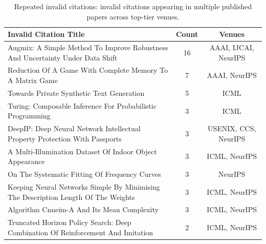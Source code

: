 \begin{table}[t]
\centering
\caption{Repeated invalid citations: invalid citations appearing in multiple published papers across top-tier venues.}
\label{tab:repeated_citation_errors}
\small
{}
\begin{tabular}{p{12cm}cc}
\toprule
\textbf{Invalid Citation Title} & \cellcolor{red!12}\textbf{Count} & \textbf{Venues} \\
\midrule
Augmix: A Simple Method To Improve Robustness And Uncertainty Under Data Shift & \cellcolor{red!30}16 & AAAI, IJCAI, NeurIPS \\
Reduction Of A Game With Complete Memory To A Matrix Game & \cellcolor{red!18}7 & AAAI, NeurIPS \\
Towards Private Synthetic Text Generation & \cellcolor{red!14}5 & ICML \\
Turing: Composable Inference For Probabilistic Programming & \cellcolor{red!10}3 & ICML \\
DeepIP: Deep Neural Network Intellectual Property Protection With Passports & \cellcolor{red!10}3 & USENIX, CCS, NeurIPS \\
A Multi-Illumination Dataset Of Indoor Object Appearance & \cellcolor{red!10}3 & ICML, NeurIPS \\
On The Systematic Fitting Of Frequency Curves & \cellcolor{red!10}3 & NeurIPS \\
Keeping Neural Networks Simple By Minimising The Description Length Of The Weights & \cellcolor{red!10}3 & ICML, NeurIPS \\
Algorithm Cnneim-A And Its Mean Complexity & \cellcolor{red!10}3 & ICML, NeurIPS \\
Truncated Horizon Policy Search: Deep Combination Of Reinforcement And Imitation & \cellcolor{red!8}2 & ICML, NeurIPS \\
\bottomrule
\end{tabular}
\end{table}

